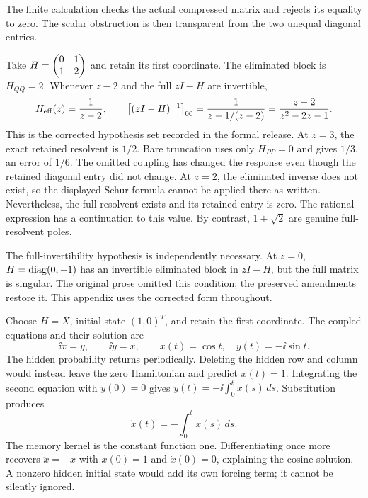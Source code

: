 The finite calculation checks the actual compressed matrix and rejects its equality to zero. The scalar obstruction is then transparent from the two unequal diagonal entries.

Take $H=\begin{pmatrix}0&1\\1&2\end{pmatrix}$ and retain its first coordinate. The eliminated block is $H_{QQ}=2$. Whenever $z-2$ and the full $zI-H$ are invertible,
\[
H_{\rm eff}(z)=\frac1{z-2},\qquad
\bigl[(zI-H)^{-1}\bigr]_{00}
=\frac1{z-1/(z-2)}=\frac{z-2}{z^2-2z-1}.
\]
This is the corrected hypothesis set recorded in the formal release.
At $z=3$, the exact retained resolvent is $1/2$. Bare truncation uses only $H_{PP}=0$ and gives $1/3$, an error of $1/6$. The omitted coupling has changed the response even though the retained diagonal entry did not change.
At $z=2$, the eliminated inverse does not exist, so the displayed Schur formula cannot be applied there as written. Nevertheless, the full resolvent exists and its retained entry is zero. The rational expression has a continuation to this value. By contrast, $1\pm\sqrt2$ are genuine full-resolvent poles.

The full-invertibility hypothesis is independently necessary. At $z=0$, $H=\operatorname{diag}(0,-1)$ has an invertible eliminated block in $zI-H$, but the full matrix is singular. The original prose omitted this condition; the preserved amendments restore it. This appendix uses the corrected form throughout.

Choose $H=X$, initial state $(1,0)^T$, and retain the first coordinate. The coupled equations and their solution are
\[
\ii\dot x=y,\qquad \ii\dot y=x,\qquad
x(t)=\cos t,\quad y(t)=-\ii\sin t.
\]
The hidden probability returns periodically. Deleting the hidden row and column would instead leave the zero Hamiltonian and predict $x(t)=1$.
Integrating the second equation with $y(0)=0$ gives $y(t)=-\ii\int_0^tx(s)\,ds$. Substitution produces
\[
\dot x(t)=-\int_0^tx(s)\,ds.
\]
The memory kernel is the constant function one. Differentiating once more recovers $\ddot x=-x$ with $x(0)=1$ and $\dot x(0)=0$, explaining the cosine solution. A nonzero hidden initial state would add its own forcing term; it cannot be silently ignored.

